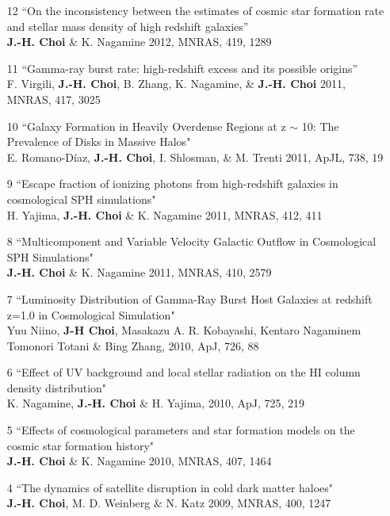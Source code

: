 \documentclass [11pt]{article}
\begin{document}
{{\begin{enumerate}
\item[12]``On the inconsistency between the estimates of cosmic star formation rate and stellar mass density of high redshift galaxies''\\ \textbf{J.-H. Choi} \& K. Nagamine 2012, MNRAS, 419, 1289

\item[11]``Gamma-ray burst rate: high-redshift excess and its possible origins''\\ F. Virgili, \textbf{J.-H. Choi}, B. Zhang, K. Nagamine, \& \textbf{J.-H. Choi} 2011, MNRAS, 417, 3025

\item[10]``Galaxy Formation in Heavily Overdense Regions at z $\sim$ 10: The Prevalence of Disks in Massive Halos" \\  E. Romano-D\'{i}az, \textbf{J.-H. Choi}, I. Shlosman, \& M. Trenti 2011, ApJL, 738, 19

\item[9]``Escape fraction of ionizing photons from high-redshift galaxies in cosmological SPH simulations" \\  H. Yajima, \textbf{J.-H. Choi} \& K. Nagamine 2011, MNRAS, 412, 411

\item[8]``Multicomponent and Variable Velocity Galactic Outflow in Cosmological SPH Simulations" \\  \textbf{J.-H. Choi} \& K. Nagamine 2011, MNRAS, 410, 2579  

\item[7]``Luminosity Distribution of Gamma-Ray Burst Host Galaxies at redshift z=1.0 in Cosmological Simulation" \\ Yuu Niino, \textbf{J-H Choi}, Masakazu A. R. Kobayashi, Kentaro Nagaminem Tomonori Totani \& Bing Zhang, 2010, ApJ, 726, 88

\item[6]``Effect of UV background and local stellar radiation on the HI column density distribution" \\  K. Nagamine, \textbf{J.-H. Choi} \& H. Yajima, 2010, ApJ, 725, 219

\item[5]``Effects of cosmological parameters and star formation models on the cosmic star formation history" \\  \textbf{J.-H. Choi} \& K. Nagamine 2010, MNRAS, 407, 1464

\item[4]``The dynamics of satellite disruption in cold dark matter haloes" \\  \textbf{J.-H. Choi}, M. D. Weinberg \& N. Katz 2009, MNRAS, 400, 1247


\end{enumerate}}}
\end{document}
